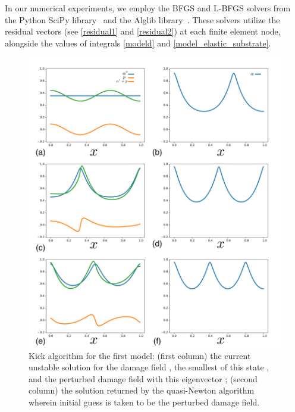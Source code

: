 In our numerical experiments, we employ the BFGS and L-BFGS solvers from the Python SciPy library~\cite{2020SciPy-NMeth} and the Alglib library~\cite{Bochkanov2013-lk}. These solvers utilize the residual vectors (see \ref{residual1} and \ref{residual2}) at each finite element node, alongside the values of integrals \eqref{modeld} and \eqref{model_elastic_substrate}.
\begin{figure}
\includegraphics[width=\textwidth]{./final_images/fig6.pdf}
    \caption{
Kick algorithm for the first model: (first column) the current unstable solution  for the damage field , the  smallest  of this state , and the perturbed damage field with this eigenvector ; (second column)  the solution returned by the quasi-Newton algorithm wherein initial guess is taken to be the perturbed damage field.
 }
    
    \label{fig:kick}
\end{figure}


